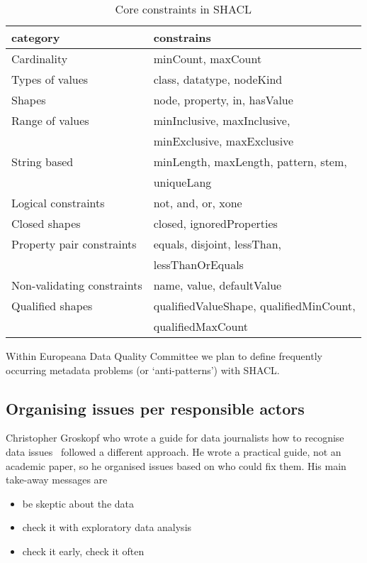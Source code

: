 \begin{table}[h]
\caption{Core constraints in SHACL}
\label{table:shacl}
\centering
\begin{tabular}{l|l}
category & constrains \\
\hline
Cardinality & minCount, maxCount \\
Types of values & class, datatype, nodeKind \\
Shapes & node, property, in, hasValue \\
Range of values & minInclusive, maxInclusive,\\
 &  minExclusive, maxExclusive  \\
String based & minLength, maxLength, pattern, stem,\\
 & uniqueLang \\
Logical constraints & not, and, or, xone \\
Closed shapes & closed, ignoredProperties \\
Property pair constraints & equals, disjoint, lessThan,\\
 & lessThanOrEquals \\
Non-validating constraints & name, value, defaultValue \\
Qualified shapes & qualifiedValueShape, qualifiedMinCount,\\  & qualifiedMaxCount \\
\end{tabular}
\end{table}

Within Europeana Data Quality Committee we plan to define frequently occurring metadata problems (or `anti-patterns') with SHACL.

\subsection{Organising issues per responsible actors}

Christopher Groskopf who wrote a guide for data journalists how to recognise data issues~\cite{groskopf2015} followed a different approach. He wrote a practical guide, not an academic paper, so he organised issues based on who could fix them. His main take-away messages are
\begin{itemize}
 \setlength{\parskip}{0pt}
 \setlength{\itemsep}{0pt plus 1pt}
 \item be skeptic about the data
 \item check it with exploratory data analysis
 \item check it early, check it often
\end{itemize}

